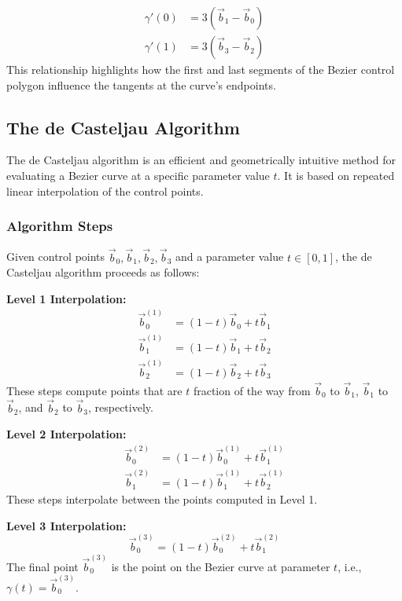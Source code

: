 \documentclass{article}
\begin{document}
\begin{align*}
\gamma'(0) &= 3(\vec{b}_1 - \vec{b}_0) \\
\gamma'(1) &= 3(\vec{b}_3 - \vec{b}_2)
\end{align*}
This relationship highlights how the first and last segments of the Bezier control polygon influence the tangents at the curve's endpoints.

\subsection{The de Casteljau Algorithm}

The de Casteljau algorithm is an efficient and geometrically intuitive method for evaluating a Bezier curve at a specific parameter value \(t\). It is based on repeated linear interpolation of the control points.

\subsubsection{Algorithm Steps}

Given control points \(\vec{b}_0, \vec{b}_1, \vec{b}_2, \vec{b}_3\) and a parameter value \(t \in [0, 1]\), the de Casteljau algorithm proceeds as follows:

\textbf{Level 1 Interpolation:}
\begin{align*}
\vec{b}_0^{(1)} &= (1-t) \vec{b}_0 + t \vec{b}_1 \\
\vec{b}_1^{(1)} &= (1-t) \vec{b}_1 + t \vec{b}_2 \\
\vec{b}_2^{(1)} &= (1-t) \vec{b}_2 + t \vec{b}_3
\end{align*}
These steps compute points that are \(t\) fraction of the way from \(\vec{b}_0\) to \(\vec{b}_1\), \(\vec{b}_1\) to \(\vec{b}_2\), and \(\vec{b}_2\) to \(\vec{b}_3\), respectively.

\textbf{Level 2 Interpolation:}
\begin{align*}
\vec{b}_0^{(2)} &= (1-t) \vec{b}_0^{(1)} + t \vec{b}_1^{(1)} \\
\vec{b}_1^{(2)} &= (1-t) \vec{b}_1^{(1)} + t \vec{b}_2^{(1)}
\end{align*}
These steps interpolate between the points computed in Level 1.

\textbf{Level 3 Interpolation:}
\begin{equation}
\vec{b}_0^{(3)} = (1-t) \vec{b}_0^{(2)} + t \vec{b}_1^{(2)}
\end{equation}
The final point \(\vec{b}_0^{(3)}\) is the point on the Bezier curve at parameter \(t\), i.e., \(\gamma(t) = \vec{b}_0^{(3)}\).
\end{document}
